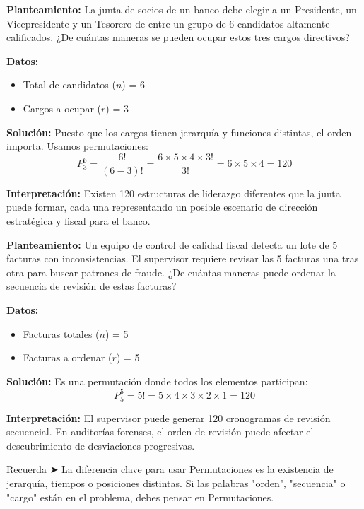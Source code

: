 \documentclass[12pt,letterpaper]{book}
\newcounter{ejemplo}[chapter]
\begin{document}
\begin{ejemplo}
    \textbf{Planteamiento:} La junta de socios de un banco debe elegir a un Presidente, un Vicepresidente y un Tesorero de entre un grupo de 6 candidatos altamente calificados. ¿De cuántas maneras se pueden ocupar estos tres cargos directivos?
    
    \textbf{Datos:}
    \begin{itemize}
        \item Total de candidatos ($n$) = 6
        \item Cargos a ocupar ($r$) = 3
    \end{itemize}
    
    \textbf{Solución:}
    Puesto que los cargos tienen jerarquía y funciones distintas, el orden importa. Usamos permutaciones:
    \[ P_{3}^{6} = \frac{6!}{(6-3)!} = \frac{6 \times 5 \times 4 \times 3!}{3!} = 6 \times 5 \times 4 = 120 \]
    
    \textbf{Interpretación:} Existen 120 estructuras de liderazgo diferentes que la junta puede formar, cada una representando un posible escenario de dirección estratégica y fiscal para el banco.
\end{ejemplo}

\begin{ejemplo}
    \textbf{Planteamiento:} Un equipo de control de calidad fiscal detecta un lote de 5 facturas con inconsistencias. El supervisor requiere revisar las 5 facturas una tras otra para buscar patrones de fraude. ¿De cuántas maneras puede ordenar la secuencia de revisión de estas facturas?
    
    \textbf{Datos:}
    \begin{itemize}
        \item Facturas totales ($n$) = 5
        \item Facturas a ordenar ($r$) = 5
    \end{itemize}
    
    \textbf{Solución:}
    Es una permutación donde todos los elementos participan:
    \[ P_{5}^{5} = 5! = 5 \times 4 \times 3 \times 2 \times 1 = 120 \]
    
    \textbf{Interpretación:} El supervisor puede generar 120 cronogramas de revisión secuencial. En auditorías forenses, el orden de revisión puede afectar el descubrimiento de desviaciones progresivas.
\end{ejemplo}

\begin{alerta}
    Recuerda ➤ La diferencia clave para usar Permutaciones es la existencia de jerarquía, tiempos o posiciones distintas. Si las palabras "orden", "secuencia" o "cargo" están en el problema, debes pensar en Permutaciones.
\end{alerta}
\end{document}
